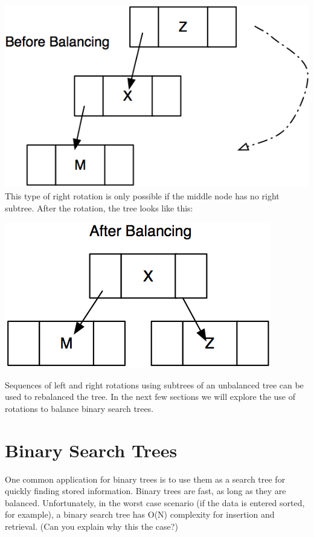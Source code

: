 \includegraphics{pictures/image9.png}
This type of right rotation is only possible if the middle node has no
right subtree.  After the rotation, the tree looks like this:

\includegraphics{pictures/image10.png}

Sequences of left and right rotations using subtrees of an unbalanced tree can be used to rebalanced the tree. In the next few sections we will explore the use of rotations to
 balance binary search trees.



\section{Binary Search Trees}

One common application for binary trees is to use them as a search tree for quickly finding stored information. Binary trees are fast, as long as they are balanced. Unfortunately, in the worst case scenario (if the data is entered sorted, for example), a binary search tree has O(N) complexity for insertion and retrieval.  (Can you explain why  this the case?)

